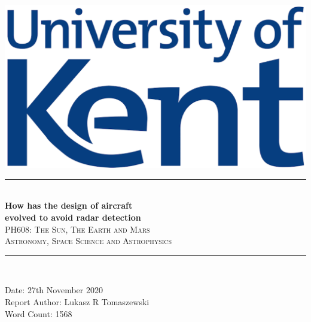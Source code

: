 \documentclass[12pt]{article}
\title{}
\begin{document}
\begin{titlepage}
\newcommand{\HRule}{\rule{\linewidth}{0.5mm}}
\begin{centering} 
\includegraphics[scale=0.7]{Images/Uni_of_Kent.png}\\[1cm]
\HRule \\ [0.3cm]
\Huge{\bfseries{How has the design of aircraft \\ evolved to avoid radar detection}} \\
\textsc{\large PH608: The Sun, The Earth and Mars}\\ [-0.1cm]
\textsc{\large Astronomy, Space Science and Astrophysics}\\ [-0.2cm]
\HRule \\[0.5cm]
\begin{minipage}{0.625\textwidth}
\begin{center} \large
{\large Date: 27th November 2020}\\[0.2cm]
{\large Report Author: Lukasz R Tomaszewski}\\[0.2cm]
{\large Word Count: 1568}\\
\end{center}
\end{minipage}\\[2cm]
\vfill
\end{centering} 
\end{titlepage}
\newpage
\begin{titlepage}
\begin{tableofcontents}
\end{tableofcontents}
\end{titlepage}
\newpage
\end{document}
